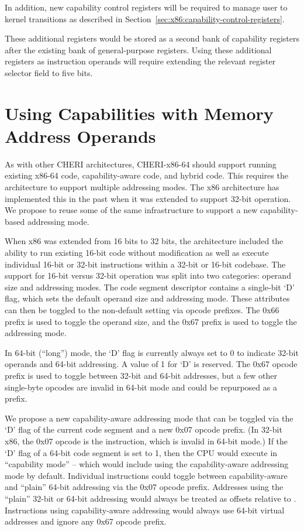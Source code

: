 In addition, new capability control registers will be required to
manage user to kernel transitions as described in
Section~\ref{sec:x86:capability-control-registers}.

These additional registers would be stored as a second bank of
capability registers after the existing bank of general-purpose
registers.  Using these additional registers as instruction operands
will require extending the relevant register selector field to five
bits.

\section{Using Capabilities with Memory Address Operands}

As with other CHERI architectures, CHERI-x86-64 should support running existing
x86-64 code, capability-aware code, and hybrid code.  This
requires the architecture to support multiple addressing modes.
The x86 architecture has implemented this in the past when it was
extended to support 32-bit operation.  We propose to reuse some of the
same infrastructure to support a new capability-based addressing
mode.

When x86 was extended from 16 bits to 32 bits, the architecture
included the ability to run existing 16-bit code without modification
as well as execute individual 16-bit or 32-bit instructions within a
32-bit or 16-bit codebase.  The support for 16-bit versus 32-bit
operation was
split into two categories: operand size and addressing modes.  The
code segment descriptor contains a single-bit `D' flag, which sets the
default operand size and addressing mode.  These attributes can then
be toggled to the non-default setting via opcode prefixes.  The 0x66
prefix is used to toggle the operand size, and the 0x67 prefix is used
to toggle the addressing mode.

In 64-bit (``long'') mode, the `D' flag is currently always set to
0 to indicate 32-bit operands and 64-bit addressing.  A value of
1 for `D' is reserved.  The 0x67 opcode prefix is used to toggle
between 32-bit and 64-bit addresses, but a few other single-byte opcodes
are invalid in 64-bit mode and could be repurposed as a prefix.

We propose a new capability-aware addressing mode that can be
toggled via the `D' flag of the current code segment and a new 0x07
opcode prefix.  (In 32-bit x86, the 0x07 opcode is the
 instruction, which is invalid in 64-bit mode.)
If the `D' flag of a 64-bit code segment is set to 1,
then the CPU would execute in ``capability mode'' -- which would include
using the capability-aware addressing mode by default.  Individual
instructions could toggle between capability-aware and ``plain''
64-bit addressing via the 0x07 opcode prefix.  Addresses using the
``plain'' 32-bit or 64-bit addressing would always be treated as offsets
relative to \DDC{}.  Instructions using capability-aware addressing
would always use 64-bit virtual addresses and ignore any 0x67 opcode
prefix.

